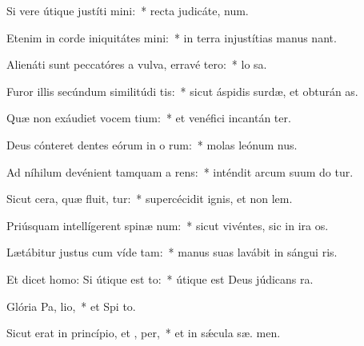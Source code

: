 \item Si vere útique justíti mini:~* recta judicáte,  num.
\item Etenim in corde iniquitátes mini:~* in terra injustítias manus  nant.
\item Alienáti sunt peccatóres a vulva, erravé  tero:~* lo  sa.
\item Furor illis secúndum similitúdi tis:~* sicut áspidis surdæ, et obturán  as.
\item Quæ non exáudiet vocem tium:~* et venéfici incantán ter.
\item Deus cónteret dentes eórum in o rum:~* molas leónum  nus.
\item Ad níhilum devénient tamquam a rens:~* inténdit arcum suum do tur.
\item Sicut cera, quæ fluit, tur:~* supercécidit ignis, et non  lem.
\item Priúsquam intellígerent spinæ  num:~* sicut vivéntes, sic in ira  os.
\item Lætábitur justus cum víde tam:~* manus suas lavábit in sángui ris.
\item Et dicet homo: Si útique est  to:~* útique est Deus júdicans   ra.
\item Glória Pa,  lio,~* et Spi to.
\item Sicut erat in princípio, et ,  per,~* et in sǽcula sæ. men.
